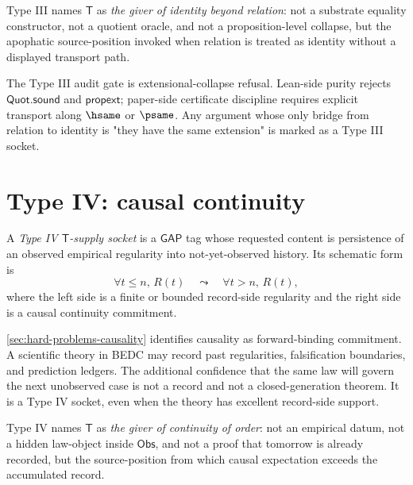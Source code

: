 \begin{definition}
\label{def:transcendental-supply-type-III-reading}
Type III names $\mathsf{T}$ as \emph{the giver of identity beyond relation}: not a substrate equality constructor, not a quotient oracle, and not a proposition-level collapse, but the apophatic source-position invoked when relation is treated as identity without a displayed transport path.
\end{definition}

\begin{remark}
\label{rem:transcendental-supply-type-III-gate}
The Type III audit gate is extensional-collapse refusal. Lean-side purity rejects $\mathsf{Quot.sound}$ and $\mathsf{propext}$; paper-side certificate discipline requires explicit transport along $\hsame$ or $\psame$. Any argument whose only bridge from relation to identity is "they have the same extension" is marked as a Type III socket.
\end{remark}

\section{Type IV: causal continuity}
\label{sec:transcendental-supply-type-IV}

\begin{definition}
\label{def:transcendental-supply-type-IV}
A \emph{Type IV $\mathsf{T}$-supply socket} is a $\mathsf{GAP}$ tag whose requested content is persistence of an observed empirical regularity into not-yet-observed history. Its schematic form is
$$
\forall t\leq n,\,R(t)
\quad\leadsto\quad
\forall t>n,\,R(t),
$$
where the left side is a finite or bounded record-side regularity and the right side is a causal continuity commitment.
\end{definition}

\begin{example}
\label{ex:transcendental-supply-type-IV-engineering}
\autoref{sec:hard-problems-causality} identifies causality as forward-binding commitment. A scientific theory in BEDC may record past regularities, falsification boundaries, and prediction ledgers. The additional confidence that the same law will govern the next unobserved case is not a record and not a closed-generation theorem. It is a Type IV socket, even when the theory has excellent record-side support.
\end{example}

\begin{definition}
\label{def:transcendental-supply-type-IV-reading}
Type IV names $\mathsf{T}$ as \emph{the giver of continuity of order}: not an empirical datum, not a hidden law-object inside $\mathsf{Obs}$, and not a proof that tomorrow is already recorded, but the source-position from which causal expectation exceeds the accumulated record.
\end{definition}

